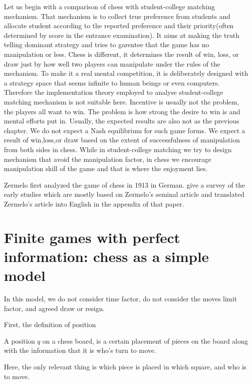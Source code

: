  Let us begin with a comparison of chess with student-college matching mechanism. That mechanism is to collect true preference from students and allocate student according to the reported preference 
 and their priority(often determined by score in the entrance examination). It
 aims at making the truth telling dominant strategy and tries to
 garentee that the game has no manipulation or less. Chess is different, it determines the result of win, loss, or draw just by how well two players can manipulate under the rules of the mechanism. 
 To make it a real mental competition, it is deliberately designed with a strategy space that seems infinite to human beings or even computers.
 Therefore the implementation theory employed to analyse student-college matching mechanism is not suitable here. Incentive is usually not the problem, the players all want to win.
 The problem is how strong the desire to win is and mental efforts put in. Usually, the expected results are also not  as the previous chapter.
 We do not expect a Nash equilibrium for such game forms. We expect a result of win,loss,or draw based on the extent of successfulness of manipulation  from both sides in chess.
 While in student-college matching we try to design mechanism that avoid the manipulation factor, in chess we encourage manipulation skill of the game and that is where the enjoyment lies.

Zermelo first analyzed the game of chess in 1913 in German. \parencite{walker2001} give a survey of the early studies which are mostly based on Zermelo's seminal article  and translated Zermelo's article into English in the appendix 
of that paper. 






\section{Finite games with perfect information: chess as a simple model}

In this model, we do not consider time factor, do not consider the moves limit factor, and agreed draw or resign.

First, the definition of position

\begin{definition}
A position $q$ on a chess board, is a certain placement of pieces on the board along with the information that it is who's turn to move.
\end{definition}

Here, the only relevant thing is which piece is placed in which square, and who is to move. 

